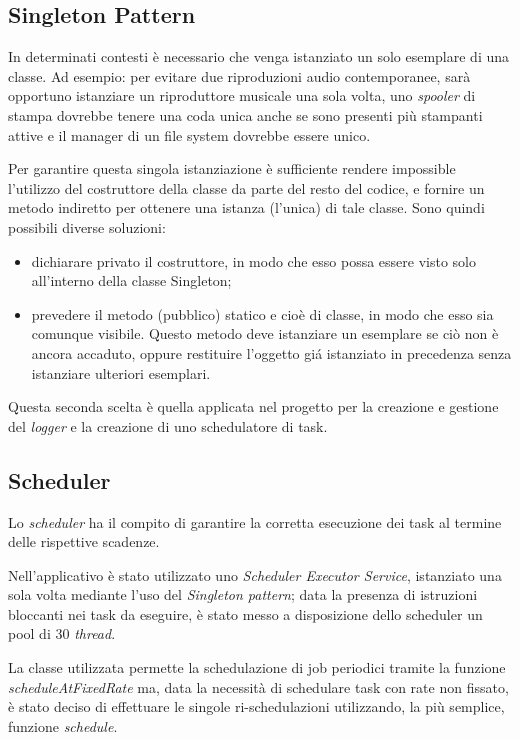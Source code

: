 \vspace*{0.5cm}
\subsection{Singleton Pattern}
In determinati contesti \`e necessario che venga istanziato un solo esemplare di una classe. Ad esempio: per evitare due riproduzioni audio contemporanee, sar\`{a} opportuno istanziare un riproduttore musicale una sola volta,
uno \textit{spooler} di stampa dovrebbe tenere una coda unica anche se sono presenti pi\`{u} stampanti attive e
il manager di un file system dovrebbe essere unico.

Per garantire questa singola istanziazione \`{e} sufficiente rendere impossible l'utilizzo del costruttore della classe da parte del resto del codice, e fornire un metodo indiretto per ottenere una istanza (l'unica) di tale classe.
Sono quindi possibili diverse soluzioni:
\begin{itemize}
	\item dichiarare privato il costruttore, in modo che esso possa essere visto solo all'interno della classe Singleton;
	\item prevedere il metodo (pubblico) statico e cio\`e di classe, in modo che esso sia comunque visibile. Questo metodo deve istanziare un esemplare se ci\`o non \`e ancora accaduto, oppure restituire l'oggetto gi\'a istanziato in precedenza senza istanziare ulteriori esemplari.
\end{itemize}
Questa seconda scelta \`e quella applicata nel progetto per la creazione e gestione del \textit{logger} e la creazione di uno schedulatore di task.

\vspace*{0.5cm}
\subsection{Scheduler}
Lo \textit{scheduler} ha il compito di garantire la corretta esecuzione dei task al termine delle rispettive scadenze.

Nell'applicativo \`{e} stato utilizzato uno \textit{Scheduler Executor Service}, istanziato una sola volta mediante l'uso del \textit{Singleton pattern}; data la presenza di istruzioni bloccanti nei task da eseguire, \`{e} stato messo a disposizione dello scheduler un pool di $30$ \textit{thread}.

La classe utilizzata permette la schedulazione di job periodici tramite la funzione \textit{scheduleAtFixedRate} ma, data la necessit\`{a} di schedulare task con rate non fissato, \`{e} stato deciso di effettuare le singole ri-schedulazioni utilizzando, la pi\`{u} semplice, funzione \textit{schedule}.


